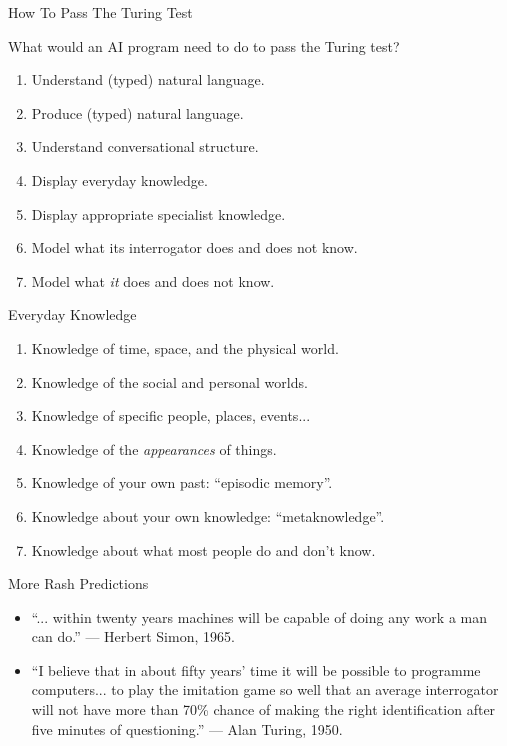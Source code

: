 \documentclass{article}
\begin{document}
\begin{slide}{}
{\Large How To Pass The Turing Test}

What would an AI program need to do to pass the Turing test?
\begin{enumerate}
\item Understand (typed) natural language.
\item Produce (typed) natural language.
\item Understand conversational structure.
\item Display everyday knowledge.
\item Display appropriate specialist knowledge.
\item Model what its interrogator does and does not know.
\item Model what {\em it} does and does not know.
\end{enumerate}
\end{slide}

\begin{slide}{}
{\Large Everyday Knowledge}
\begin{enumerate}
\item Knowledge of time, space, and the physical world.
\item Knowledge of the social and personal worlds.
\item Knowledge of specific people, places, events...
\item Knowledge of the {\em appearances} of things.
\item Knowledge of your own past: ``episodic memory''.
\item Knowledge about your own knowledge: ``metaknowledge''.
\item Knowledge about what most people do and don't know.
\end{enumerate}
\end{slide}

\begin{slide}{}
{\Large More Rash Predictions}
\begin{itemize}
\item ``... within twenty years machines will be
capable of doing any work a man can do.'' --- Herbert Simon, 1965.
\item ``I believe that in about fifty years' time it will be possible
to programme computers... to play the imitation game so well that an
average interrogator will not have more than 70\% chance of making the
right identification after five minutes of questioning.'' --- Alan
Turing, 1950.
\end{itemize}
\end{slide}
\end{document}

